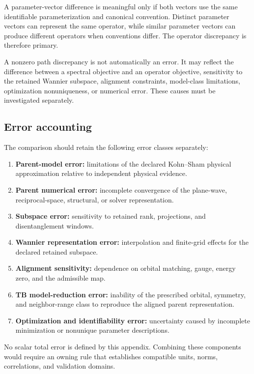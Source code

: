 A parameter-vector difference is meaningful only if both vectors use the same
identifiable parameterization and canonical convention. Distinct parameter
vectors can represent the same operator, while similar parameter vectors can
produce different operators when conventions differ. The operator discrepancy
is therefore primary.

A nonzero path discrepancy is not automatically an error. It may reflect the
difference between a spectral objective and an operator objective, sensitivity
to the retained Wannier subspace, alignment constraints, model-class
limitations, optimization nonuniqueness, or numerical error. These causes must
be investigated separately.

\subsection{Error accounting}

The comparison should retain the following error classes separately:
\begin{enumerate}
    \item \textbf{Parent-model error:} limitations of the declared Kohn--Sham
          physical approximation relative to independent physical evidence.
    \item \textbf{Parent numerical error:} incomplete convergence of the
          plane-wave, reciprocal-space, structural, or solver representation.
    \item \textbf{Subspace error:} sensitivity to retained rank, projections,
          and disentanglement windows.
    \item \textbf{Wannier representation error:} interpolation and finite-grid
          effects for the declared retained subspace.
    \item \textbf{Alignment sensitivity:} dependence on orbital matching,
          gauge, energy zero, and the admissible map.
    \item \textbf{TB model-reduction error:} inability of the prescribed
          orbital, symmetry, and neighbor-range class to reproduce the aligned
          parent representation.
    \item \textbf{Optimization and identifiability error:} uncertainty caused
          by incomplete minimization or nonunique parameter descriptions.
\end{enumerate}
No scalar total error is defined by this appendix. Combining these components would
require an owning rule that establishes compatible units, norms, correlations,
and validation domains.

